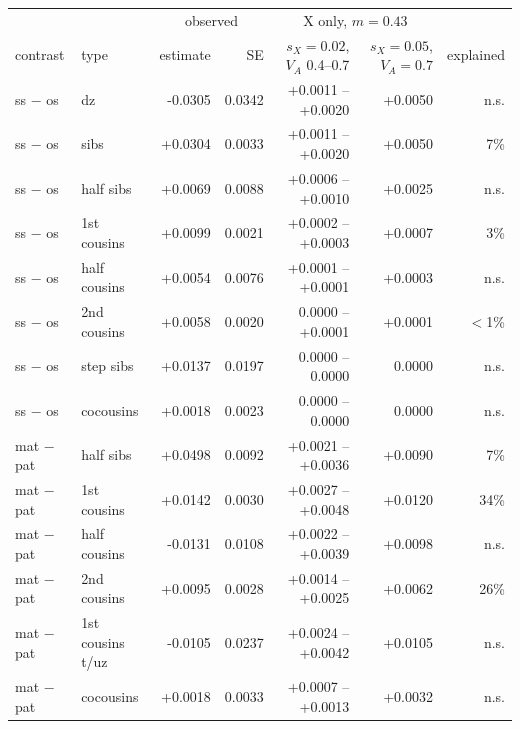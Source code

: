 \begin{tabular}{ll|rr|rr|r}\toprule
 & & \multicolumn{2}{c|}{observed} & \multicolumn{2}{c|}{X only, $m=0.43$} & \\
contrast & type & estimate & SE & $s_X{=}0.02$, $V_A$ 0.4--0.7 & $s_X{=}0.05$, $V_A{=}0.7$ & explained\\\midrule
ss $-$ os & dz & -0.0305 & 0.0342 & +0.0011 -- +0.0020 & +0.0050 & n.s. \\
ss $-$ os & sibs & +0.0304 & 0.0033 & +0.0011 -- +0.0020 & +0.0050 & 7\% \\
ss $-$ os & half sibs & +0.0069 & 0.0088 & +0.0006 -- +0.0010 & +0.0025 & n.s. \\
ss $-$ os & 1st cousins & +0.0099 & 0.0021 & +0.0002 -- +0.0003 & +0.0007 & 3\% \\
ss $-$ os & half cousins & +0.0054 & 0.0076 & +0.0001 -- +0.0001 & +0.0003 & n.s. \\
ss $-$ os & 2nd cousins & +0.0058 & 0.0020 & 0.0000 -- +0.0001 & +0.0001 & $<$1\% \\
ss $-$ os & step sibs & +0.0137 & 0.0197 & 0.0000 -- 0.0000 & 0.0000 & n.s. \\
ss $-$ os & cocousins & +0.0018 & 0.0023 & 0.0000 -- 0.0000 & 0.0000 & n.s. \\
mat $-$ pat & half sibs & +0.0498 & 0.0092 & +0.0021 -- +0.0036 & +0.0090 & 7\% \\
mat $-$ pat & 1st cousins & +0.0142 & 0.0030 & +0.0027 -- +0.0048 & +0.0120 & 34\% \\
mat $-$ pat & half cousins & -0.0131 & 0.0108 & +0.0022 -- +0.0039 & +0.0098 & n.s. \\
mat $-$ pat & 2nd cousins & +0.0095 & 0.0028 & +0.0014 -- +0.0025 & +0.0062 & 26\% \\
mat $-$ pat & 1st cousins t/uz & -0.0105 & 0.0237 & +0.0024 -- +0.0042 & +0.0105 & n.s. \\
mat $-$ pat & cocousins & +0.0018 & 0.0033 & +0.0007 -- +0.0013 & +0.0032 & n.s. \\
\bottomrule\end{tabular}

